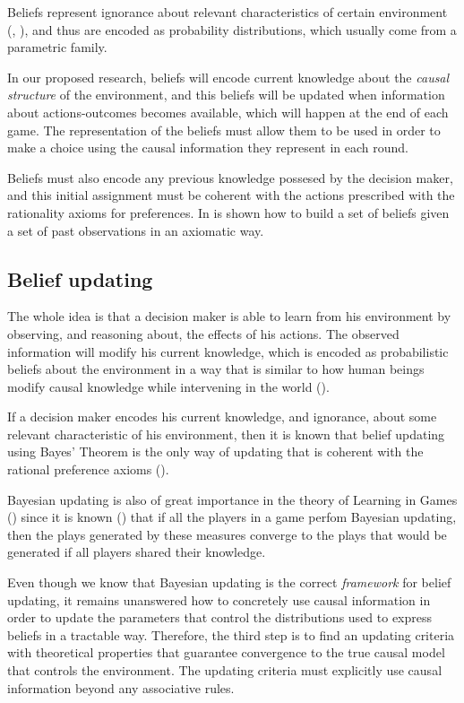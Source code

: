 \documentclass[english,letterpaper,12pt,final]{article}
\theoremstyle{definition}
\begin{document}
Beliefs represent ignorance about relevant characteristics of certain environment (\cite{bernardo2000bayesian}, \cite{peterson2017introduction}), and thus are encoded as probability distributions, which usually come from a parametric family. 

In our proposed research, beliefs will encode current knowledge about the \textit{causal structure} of the environment, and this beliefs will be updated when information about actions-outcomes becomes available, which will happen at the end of each game. The representation of the beliefs must allow them to be used in order to make a choice using the causal information they represent in each round.

Beliefs must also encode any previous knowledge possesed by the decision maker, and this initial assignment must be coherent with the actions prescribed with the rationality axioms for preferences. In \cite{billot2005probabilities} is shown how to build a set of beliefs given a set of past observations in an axiomatic way.

\subsection{Belief updating}
The whole idea is that a decision maker is able to learn from his environment by observing, and reasoning about, the effects of his actions. The observed information will modify his current knowledge, which is encoded as probabilistic beliefs about the environment in a way that is similar to how human beings modify causal knowledge while intervening in the world (\cite{hagmayer2013repeated}).

If a decision maker encodes his current knowledge, and ignorance, about some relevant characteristic of his environment, then it is known that belief updating using Bayes' Theorem is the only way of updating that is coherent with the rational preference axioms (\cite{bernardo2000bayesian}). 

Bayesian updating is also of great importance in the theory of Learning in Games (\cite{fudenberg1998theory}) since it is known (\cite{shoham2008multiagent}) that if all the players in a game perfom Bayesian updating, then the plays generated by these measures converge to the plays that would be generated if all players shared their knowledge.

Even though we know that Bayesian updating is the correct \textit{framework} for belief updating, it remains unanswered how to concretely use causal information in order to update the parameters that control the distributions used to express beliefs in a tractable way. Therefore, the third step is to find an updating criteria with theoretical properties that guarantee convergence to the true causal model that controls the environment. The updating criteria must explicitly use causal information beyond any associative rules. 
\end{document}
